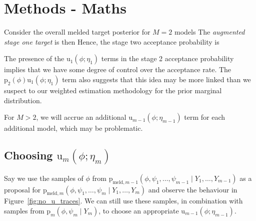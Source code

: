 \documentclass[10pt,a4paper,]{article}
\newcommand{\pd}{\text{p}}
\newcommand{\tarw}{\text{u}}
\newcommand{\Nm}{M}
\newcommand{\modelindex}{m}
\begin{document}
\section{Methods - Maths}\label{methods---maths}

Consider the overall melded target posterior for \(\Nm = 2\) models
 The
\emph{augmented stage one target} is then
 Hence, the stage two
acceptance probability is


The presence of the \(\tarw_{1}(\phi; \eta_{1})\) terms in the stage 2
acceptance probability implies that we have some degree of control over
the acceptance rate. The \(\pd_{2}(\phi) \tarw_{1}(\phi; \eta_{1})\)
term also suggests that this idea may be more linked than we suspect to
our weighted estimation methodology for the prior marginal distribution.

For \(\Nm > 2\), we will accrue an additional
\(\tarw_{\modelindex - 1}(\phi; \eta_{\modelindex - 1})\) term for each
additional model, which may be problematic.

\subsection{\texorpdfstring{Choosing
\(\tarw_{\modelindex}(\phi; \eta_{\modelindex})\)}{Choosing \textbackslash{}tarw\_\{\textbackslash{}modelindex\}(\textbackslash{}phi; \textbackslash{}eta\_\{\textbackslash{}modelindex\})}}\label{choosing-tarw_modelindexphi-eta_modelindex}

Say we use the samples of \(\phi\) from
\(\pd_{\text{meld}, \modelindex - 1}(\phi, \psi_{1}, \ldots, \psi_{\modelindex - 1} \mid Y_{1}, \ldots, Y_{\modelindex - 1})\)
as a proposal for
\(\pd_{\text{meld}, \modelindex}(\phi, \psi_{1}, \ldots, \psi_{\modelindex} \mid Y_{1}, \ldots, Y_{\modelindex})\)
and observe the behaviour in Figure~\ref{fig:no_u_traces}. We can still
use these samples, in combination with samples from
\(\pd_{\modelindex}(\phi, \psi_{\modelindex} \mid Y_{\modelindex})\), to
choose an appropriate
\(\tarw_{\modelindex - 1}(\phi; \eta_{\modelindex - 1})\).
\end{document}
